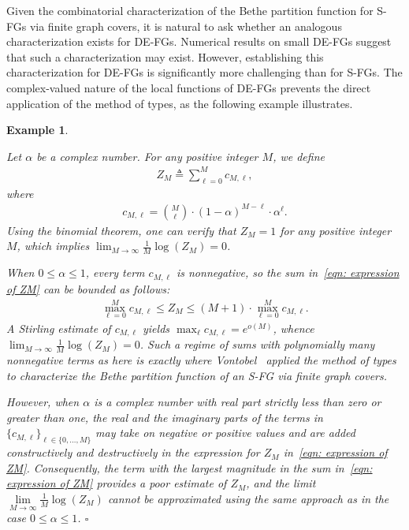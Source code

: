 \documentclass[journal]{IEEEtran}
\newcommand{\add}[1]{{\color{black}#1}}
\newtheorem{example}[theorem]{Example}
\newcommand{\manualendsymbol}[1]{%
  \leavevmode\unskip\penalty9999\hbox{}\nobreak\hfill
  \quad\hbox{#1}}
\newcommand{\eexample}{\manualendsymbol{\ensuremath{\square}}}
\newcommand{\defeq}{ \triangleq }
\begin{document}
\add{Given} the combinatorial characterization of the Bethe partition function
for S-FGs via finite graph covers, it is natural to ask whether an analogous
characterization exists for DE-FGs. Numerical results on small DE-FGs suggest
that such a characterization may exist. However, establishing this
characterization for DE-FGs is significantly more challenging than for
S-FGs. The complex-valued nature of the local functions of DE-FGs prevents the
direct application of the method of types\add{, as the following example
  illustrates}.

\begin{example}
  \label{example:simple:complex:sum:1}

  \add{Let $ \alpha $ be a complex number.}
  For any positive integer $ M $, we define
  \begin{align}
    Z_{M} \defeq
    \sum\limits_{\ell = 0}^{M} c_{M,\ell},
    \label{eqn: expression of ZM}
  \end{align}
  where
  \begin{align*}
    c_{M,\ell} = \binom{M}{ \ell }
    \cdot ( 1 - \alpha )^{M - \ell}
    \cdot \alpha^{ \ell }.
  \end{align*}
  \add{Using the binomial theorem, one can verify that $ Z_{M} = 1 $ for any
    positive integer $M$, which implies
    $\lim_{M \to \infty} \frac{1}{M} \log(Z_M) = 0$.}

  \add{When $ 0 \leq \alpha \leq 1 $, every term $ c_{M,\ell} $ is
    nonnegative, so the sum in~\eqref{eqn: expression of ZM} can be bounded as
    follows:
    \begin{align*}
      \max\limits_{\ell=0}^{M} c_{M,\ell}
      \leq
      Z_M
      \leq
      (M \! + \! 1) \cdot \max\limits_{\ell=0}^{M} c_{M,\ell}.
    \end{align*}
    A Stirling estimate of $c_{M,\ell}$ yields
    $ \max_{\ell} c_{M,\ell} = e^{o(M)} $, whence
    $\lim_{M \to \infty} \frac{1}{M} \log(Z_{M}) = 0$. Such a regime of sums
    with polynomially many nonnegative terms as here is exactly where
    Vontobel~\cite{Vontobel2013} applied the method of types to characterize
    the Bethe partition function of an S-FG via finite graph covers.}

  However, when $ \alpha $ is a \add{complex number} with real part strictly
  less than zero or greater than one, the real and the imaginary parts of the
  terms in $ \{c_{M,\ell} \}_{\ell \in \{0,\ldots,M\} } $ may take on negative
  or positive values and are added constructively and destructively in the
  expression for $Z_{M}$ in~\eqref{eqn: expression of ZM}. Consequently, the
  term with the largest magnitude in the sum in~\eqref{eqn: expression of ZM}
  provides a poor estimate of $ Z_{M} $, and the limit
  $ \lim\limits_{ M \to \infty } \frac{1}{M} \log(Z_{M}) $ cannot be
  approximated using the same approach as in the case
  $ 0 \leq \alpha \leq 1 $.  \eexample
\end{example}
\end{document}
